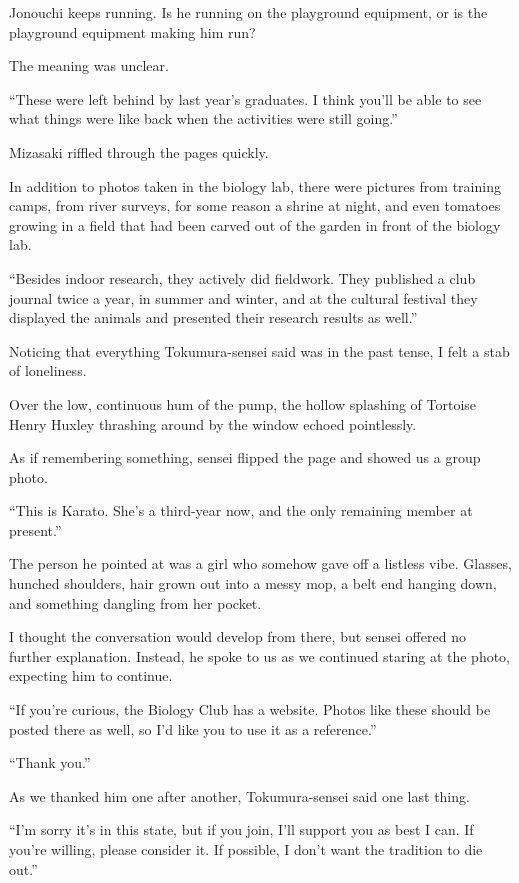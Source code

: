 \documentclass[
    a4paper,
    12pt,
    twoside,
    openany,
    UTF8,
    fontset=windows
]{ctexbook}
\begin{document}
Jonouchi keeps running. Is he running on the playground equipment, or is the playground equipment making him run?

The meaning was unclear.

``These were left behind by last year's graduates. I think you'll be able to see what things were like back when the activities were still going.''

Mizasaki riffled through the pages quickly.

In addition to photos taken in the biology lab, there were pictures from training camps, from river surveys, for some reason a shrine at night, and even tomatoes growing in a field that had been carved out of the garden in front of the biology lab.

``Besides indoor research, they actively did fieldwork. They published a club journal twice a year, in summer and winter, and at the cultural festival they displayed the animals and presented their research results as well.''

Noticing that everything Tokumura-sensei said was in the past tense, I felt a stab of loneliness.

Over the low, continuous hum of the pump, the hollow splashing of Tortoise Henry Huxley thrashing around by the window echoed pointlessly.

As if remembering something, sensei flipped the page and showed us a group photo.

``This is Karato. She's a third-year now, and the only remaining member at present.''

The person he pointed at was a girl who somehow gave off a listless vibe. Glasses, hunched shoulders, hair grown out into a messy mop, a belt end hanging down, and something dangling from her pocket.

I thought the conversation would develop from there, but sensei offered no further explanation. Instead, he spoke to us as we continued staring at the photo, expecting him to continue.

``If you're curious, the Biology Club has a website. Photos like these should be posted there as well, so I'd like you to use it as a reference.''

``Thank you.''

As we thanked him one after another, Tokumura-sensei said one last thing.

``I'm sorry it's in this state, but if you join, I'll support you as best I can. If you're willing, please consider it. If possible, I don't want the tradition to die out.''
\end{document}
